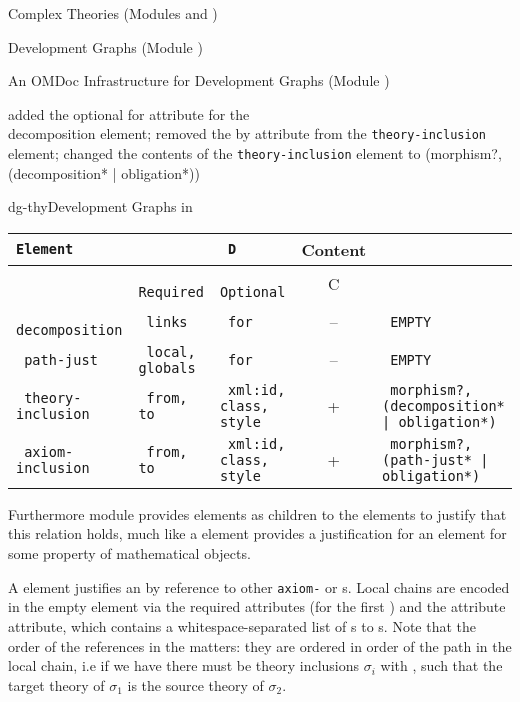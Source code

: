 \begin{tchapter}[id=complex-theories,short=Complex Theories]{Complex Theories (Modules
    {} and {})}
\begin{tsection}[id=development-graphs,short=Development Graphs]{Development Graphs
    (Module {})}
\begin{tsubsection}[id=dg-omdoc,short=OMDoc Development Graphs]{An OMDoc Infrastructure
    for Development Graphs (Module {})}
\begin{erratum}[date=2007-09-10,reported-by=Kristina Sojakova]{added the optional for attribute for the {\\decomposition}
  element; removed the by attribute from the {\tt theory-inclusion} element; changed the contents of the
  {\tt theory-inclusion} element to (morphism?, (decomposition* | obligation*))} 
\begin{myfig}{dg-thy}{Development Graphs in {\omdoc}}
\begin{scriptsize}
\begin{tabular}{|>{\tt}l|>{\tt}p{}|>{\tt}p{}|c|>{\tt}p{}|}\hline
{\rm Element}& \multicolumn{2}{l|}{Attributes} & D & Content  \\\hline
             & {\rm Required} & {\rm Optional}     & C &           \\\hline\hline
 decomposition  & links       & for                & -- & EMPTY\\\hline
 path-just   & local, globals & for                & -- & EMPTY\\\hline
 theory-inclusion & from, to  & xml:id, class, style & +  & morphism?, (decomposition* | obligation*)\\\hline
 axiom-inclusion  & from, to  & xml:id, class, style & +  & morphism?, (path-just* | obligation*)\\\hline
\end{tabular}
\end{scriptsize}
\end{myfig}
\end{erratum}

Furthermore module {} provides {} elements as children
to the {} elements to justify that this relation holds, much like
a {} element provides a justification for an {} element
for some property of mathematical objects.

A {} element justifies an {} by reference to
other {\tt{axiom-}} or {s}. Local chains are
encoded in the empty {} element via the required attributes
{} (for the first {}) and the
attribute {} attribute, which contains a
whitespace-separated list of {s} to
{s}. Note that the order of the references in the
{} matters: they are ordered in order of the path in
the local chain, i.e if we have {} there
must be theory inclusions $\sigma_i$ with {}, such that the
target theory of $\sigma_1$ is the source theory of $\sigma_2$.


\end{tsubsection}
\end{tsection}
\end{tchapter}
